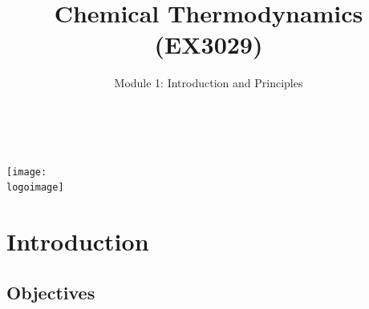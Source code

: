 \documentclass[10pt,compress]{beamer}
\institute{School of Engineering}
\title{Chemical Thermodynamics (EX3029)}
\subtitle{Module 1: Introduction and Principles}
\date[ ]{ }
\author[\shortname]{%
  \fullname\\\ttfamily{\emailaddress}
}
\newcommand{\logoimage}{../../FigBanner/UoAHorizBanner}
\begin{document}
\begin{frame}
  \titlepage
  \vfill%
  \begin{center}
    \texttt{[image: \\logoimage]}
  \end{center}
\end{frame}




\section{Introduction} 


\subsection{Objectives}
\end{document}
